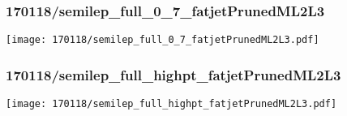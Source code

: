 \begin{frame}
   \frametitle{\small 170118/semilep\_full\_0\_7\_fatjetPrunedML2L3}
   \centering
   \texttt{[image: 170118/semilep\_full\_0\_7\_fatjetPrunedML2L3.pdf]}
\end{frame}

\begin{frame}
   \frametitle{\small 170118/semilep\_full\_highpt\_fatjetPrunedML2L3}
   \centering
   \texttt{[image: 170118/semilep\_full\_highpt\_fatjetPrunedML2L3.pdf]}
\end{frame}

